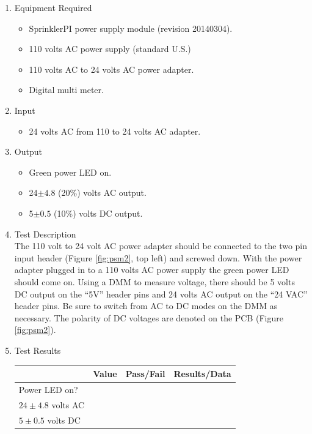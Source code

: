 \documentclass{article}
\begin{document}
\begin{enumerate}
\item Equipment Required
	\begin{itemize}
	\item SprinklerPI power supply module (revision 20140304).
	\item 110 volts AC power supply (standard U.S.)
	\item 110 volts AC to 24 volts AC power adapter.
	\item Digital multi meter.
	\end{itemize}
\item Input
	\begin{itemize}
	\item 24 volts AC from 110 to 24 volts AC adapter.
	\end{itemize}
\item Output
	\begin{itemize}
	\item Green power LED on.
	\item 24$\pm4.8$ (20\%) volts AC output.
	\item 5$\pm0.5$ (10\%) volts DC output.
	\end{itemize}
\item Test Description \\

The 110 volt to 24 volt AC power adapter should be connected to the
two pin input header (Figure \ref{fig:psm2}, top left) and screwed down.
With the power adapter plugged in to a 110 volts AC power supply the
green power LED should come on.
Using a DMM to measure voltage, there should be 5 volts DC output on
the ``5V'' header pins and 24 volts AC output on the ``24 VAC'' header pins.
Be sure to switch from AC to DC modes on the DMM as necessary.
The polarity of DC voltages are denoted on the PCB (Figure \ref{fig:psm2}).

\pagebreak
\item Test Results \\
	\vspace{0.2in}
	\begin{tabular}{|l|l|l|l|}
		\hline
		& Value & Pass/Fail & Results/Data\hspace{2in} \\
		\hline
		Power LED on? &&& \\
		\hline
		$24\pm4.8$ volts AC &&& \\
		\hline
		$5\pm0.5$ volts DC &&& \\
		\hline
	\end{tabular}
\end{enumerate}
\end{document}
